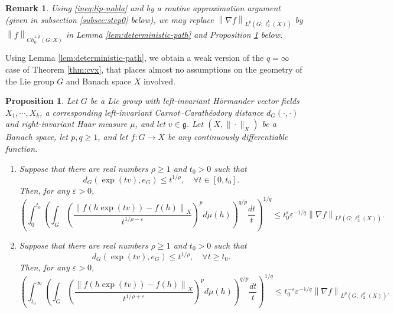 \documentclass[11pt,reqno]{amsart}
\newtheorem{proposition}[theorem]{Proposition}
\newtheorem{remark}[theorem]{Remark}
\newcommand{\1}{\mathbf 1}
\begin{document}
\begin{remark}
    Using \eqref{ineq:lip-nabla} and by a routine approximation argument (given in subsection \ref{subsec:step0} below), we may replace $\left\|\nabla f\right\|_{L^p\left(G;\ell_2^k(X)\right)}$ by $\left\| f\right\|_{\dot{Ch}_0^{1,p}\left(G;X\right)}$ in Lemma \ref{lem:deterministic-path} and Proposition \ref{prop:trivial-vvsh} below.
\end{remark}
Using Lemma \ref{lem:deterministic-path}, we obtain a weak version of the $q=\infty$ case of Theorem \ref{thm:cvx}, that places almost no assumptions on the geometry of the Lie group $G$ and Banach space $X$ involved.
\begin{proposition}\label{prop:trivial-vvsh}
    Let $G$ be a Lie group with left-invariant H\"ormander vector fields $X_1,\cdots,X_k$, a corresponding left-invariant Carnot--Carath\'eodory distance $d_G\left(\cdot,\cdot\right)$ and right-invariant Haar measure $\mu$, and let $v\in \mathfrak{g}$. Let $\left(X,\|\cdot\|_X\right)$ be a Banach space, let $p,q\ge 1$, and let $f:G\to X$ be any continuously differentiable function.
    \begin{enumerate}
        \item Suppose that there are real numbers $\rho\ge 1$ and $t_0>0$ such that
        \begin{equation}\label{eq:rho-ineq-short}
        d_G\left(\exp\left(tv\right),e_G\right)\le t^{1/\rho}, \quad \forall t\in \left[0,t_0\right].
        \end{equation}
        Then, for any $\varepsilon>0$,
        \begin{equation}\label{eq:trivial-vvsh-short}
        \left(\int_0^{t_0} \left(\int_{G}\left(\frac{\left\|f\left(h\exp\left(tv\right)\right)-f\left(h\right)\right\|_X}{t^{1/\rho-\varepsilon}}\right)^pd\mu\left(h\right)\right)^{q/p}\frac{dt}{t}\right)^{1/q}\le t_0^\varepsilon\varepsilon^{-1/q}\left\|\nabla f\right\|_{L^p\left(G;\ell_2^k(X)\right)}.
        \end{equation}
        \item Suppose that there are real numbers $\rho\ge 1$ and $t_0>0$ such that
        \begin{equation}\label{eq:rho-ineq-long}
        d_G\left(\exp\left(tv\right),e_G\right)\le t^{1/\rho}, \quad \forall t\ge t_0.
        \end{equation}
        Then, for any $\varepsilon>0$,
        \begin{equation}\label{eq:trivial-vvsh-long}
        \left(\int_{t_0}^\infty \left(\int_{G}\left(\frac{\left\|f\left(h\exp\left(tv\right)\right)-f\left(h\right)\right\|_X}{t^{1/\rho+\varepsilon}}\right)^pd\mu\left(h\right)\right)^{q/p}\frac{dt}{t}\right)^{1/q}\le t_0^{-\varepsilon}\varepsilon^{-1/q}\left\|\nabla f\right\|_{L^p\left(G;\ell_2^k(X)\right)}.
        \end{equation}
    \end{enumerate}
\end{proposition}
\end{document}
